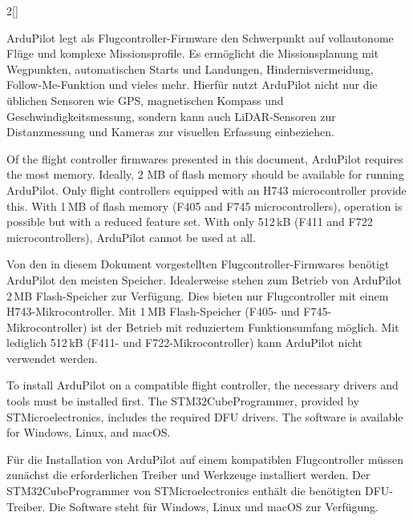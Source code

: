 \begin{paracol}{2}[]
\colger

ArduPilot legt als Flugcontroller-Firmware den Schwerpunkt auf vollautonome Flüge und komplexe Missionsprofile. Es ermöglicht die Missionsplanung mit Wegpunkten, automatischen Starts und Landungen, Hindernisvermeidung, Follow-Me-Funktion und vieles mehr. Hierfür nutzt ArduPilot nicht nur die üblichen Sensoren wie GPS, magnetischen Kompass und Geschwindigkeitsmessung, sondern kann auch LiDAR-Sensoren zur Distanzmessung und Kameras zur visuellen Erfassung einbeziehen.

\coleng

Of the flight controller firmwares presented in this document, ArduPilot requires the most memory. Ideally, 2 MB of flash memory should be available for running ArduPilot. Only flight controllers equipped with an H743 microcontroller provide this. With 1\,MB of flash memory (F405 and F745 microcontrollers), operation is possible but with a reduced feature set. With only 512\,kB (F411 and F722 microcontrollers), ArduPilot cannot be used at all.

\colger

Von den in diesem Dokument vorgestellten Flugcontroller-Firmwares benötigt ArduPilot den meisten Speicher. Idealerweise stehen zum Betrieb von ArduPilot 2\,MB Flash-Speicher zur Verfügung. Dies bieten nur Flugcontroller mit einem H743-Mikrocontroller. Mit 1\,MB Flash-Speicher (F405- und F745-Mikrocontroller) ist der Betrieb mit reduziertem Funktionsumfang möglich. Mit lediglich 512\,kB (F411- und F722-Mikrocontroller) kann ArduPilot nicht verwendet werden.

\colende

\renewcommand{\deutschertitel}{Software- und Firmware-Voraussetzungen}
\renewcommand{\englischertitel}{Software and Firmware Requirements}
\makrounterabschnitt
\label{SoftwareFirmwareRequirementsArduPilot}

To install ArduPilot on a compatible flight controller, the necessary drivers and tools must be installed first. The STM32CubeProgrammer, provided by STMicroelectronics, includes the required DFU drivers. The software is available for Windows, Linux, and macOS.

\colger

Für die Installation von ArduPilot auf einem kompatiblen Flugcontroller müssen zunächst die erforderlichen Treiber und Werkzeuge installiert werden. Der STM32CubeProgrammer von STMicroelectronics enthält die benötigten DFU-Treiber. Die Software steht für Windows, Linux und macOS zur Verfügung.


\end{paracol}
